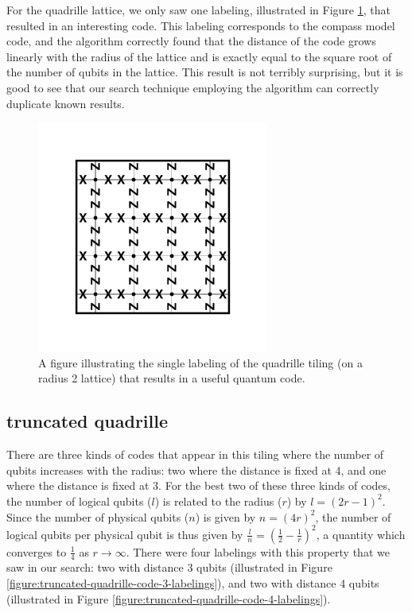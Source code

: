 \documentclass[12pt]{amsbook}
\theoremstyle{plain}
\theoremstyle{definition}
\theoremstyle{remark}
\newcommand{\half}{\frac{1}{2}}
\newcommand{\paren}[1]{\left(#1\right)}
\begin{document}
For the quadrille lattice, we only saw one labeling, illustrated in Figure \ref{figure:quadrille-code-labeling}, that resulted in an interesting code.  This labeling corresponds to the compass model code, and the algorithm correctly found that the distance of the code grows linearly with the radius of the lattice and is exactly equal to the square root of the number of qubits in the lattice.  This result is not terribly surprising, but it is good to see that our search technique employing the algorithm can correctly duplicate known results.

\begin{figure}
\includegraphics[width=3in]{images/quadrille-code-labeling}
\caption{
\label{figure:quadrille-code-labeling}
A figure illustrating the single labeling of the quadrille tiling (on a radius 2 lattice) that results in a useful quantum code.
}
\end{figure}
\subsection{truncated quadrille}

There are three kinds of codes that appear in this tiling where the number of qubits increases with the radius:  two where the distance is fixed at 4, and one where the distance is fixed at 3.  For the best two of these three kinds of codes, the number of logical qubits ($l$) is related to the radius ($r$) by $l=(2r-1)^2$.    Since the number of physical qubits ($n$) is given by $n=(4r)^2$, the number of logical qubits per physical qubit is thus given by $\frac{l}{n}=\paren{\half-\frac{1}{r}}^2$, a quantity which converges to $\frac{1}{4}$ as $r\to\infty$.  There were four labelings with this property that we saw in our search:  two with distance 3 qubits (illustrated in Figure \ref{figure:truncated-quadrille-code-3-labelings}), and two with distance 4 qubits (illustrated in Figure \ref{figure:truncated-quadrille-code-4-labelings}).
\end{document}

